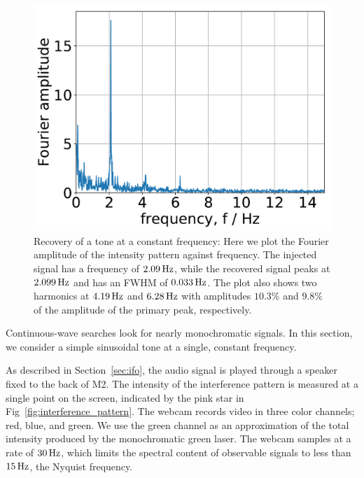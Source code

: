 \documentclass[paper-main.tex]{subfiles}
\begin{document}
\begin{figure}
	\includegraphics[width=.45\textwidth]{figures/webcam_spectrum_expt_4_0209.pdf}
	\caption{\label{fig:webcam_spectrum}
Recovery of a tone at a constant frequency: Here we plot the Fourier amplitude of the intensity pattern against frequency.
The injected signal has a frequency of $2.09\,{\rm Hz}$, while the recovered signal peaks at $2.099\,{\rm Hz}$ and has an FWHM of $0.033\,{\rm Hz}$.
The plot also shows two harmonics at $4.19\,{\rm Hz}$ and $6.28\,{\rm Hz}$ with amplitudes $10.3 \%$ and $9.8 \%$ of the amplitude of the primary peak, respectively.
}	
\end{figure}


Continuous-wave searches look for nearly monochromatic signals. In this section, we consider a simple sinusoidal tone at a single, constant frequency. %

As described in Section~\ref{sec:ifo}, the audio signal is played through a speaker fixed to the back of M2. 
The intensity of the interference pattern is measured at a single point on the screen, indicated by the pink star in Fig~\ref{fig:interference_pattern}. 
The webcam records video in three color channels; red, blue, and green. 
We use the green channel as an approximation of the total intensity produced by the monochromatic green laser.
The webcam samples at a rate of $30\, {\rm Hz}$, which limits the spectral content of observable signals to less than $15\,{\rm Hz}$, the Nyquist frequency. 


\end{document}
